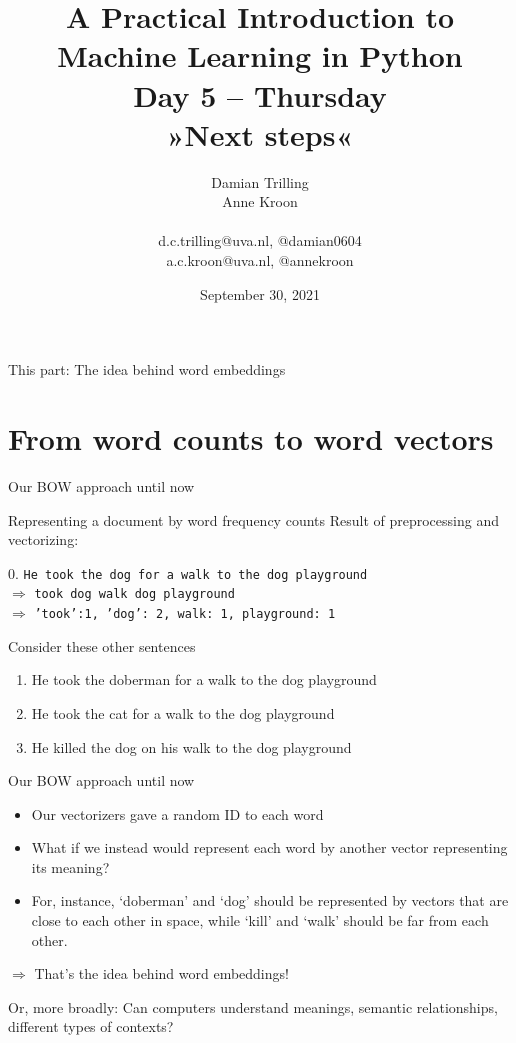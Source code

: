 \documentclass[compress]{beamer}
\title[ML in PYthon]{\textbf{A Practical Introduction to Machine Learning in Python} \\Day 5 -- Thursday \\ »Next steps«}
\author[Damian Trilling, Anne Kroon]{Damian Trilling \\ Anne Kroon \\ ~ \\ \footnotesize{d.c.trilling@uva.nl, @damian0604 \\a.c.kroon@uva.nl, @annekroon} \\}
\date{September 30, 2021}
\institute[Gesis]{Gesis}
\begin{document}
\begin{frame}{}
	\titlepage
\end{frame}

\begin{frame}{This part: The idea behind word embeddings}
	\tableofcontents
\end{frame}





\section{From word counts to word vectors}


\begin{frame}{Our BOW approach until now}
	\begin{block}{Representing a document by word frequency counts}
		Result of preprocessing and vectorizing:
		
		0. \texttt{He took the dog for a walk to the dog playground}\\
		$\Rightarrow$ \texttt{took dog walk dog playground}\\
		$\Rightarrow$ \texttt{'took':1, 'dog': 2, walk: 1, playground: 1}
	\end{block}
	
	Consider these other sentences
	\begin{enumerate}
		\item<2-> He took the doberman for a walk to the dog playground
		\item<3-> He took the cat for a walk to the dog playground
		\item<4-> He killed the dog on his walk to the dog playground 
	\end{enumerate}
	
	
\end{frame}


\begin{frame}{Our BOW approach until now}
	\begin{itemize}
		\item Our vectorizers gave a random ID to each word
		\item What if we instead would represent each word by another vector representing its meaning?
		\item For, instance, `doberman' and `dog' should be represented by vectors that are close to each other in space, while `kill' and `walk' should be far from each other.
	\end{itemize}
	\pause
	$\Rightarrow$ That's the idea behind word embeddings!
	
	\pause
	
	Or, more broadly: Can computers understand meanings, semantic relationships, different types of contexts?
\end{frame}
\end{document}
